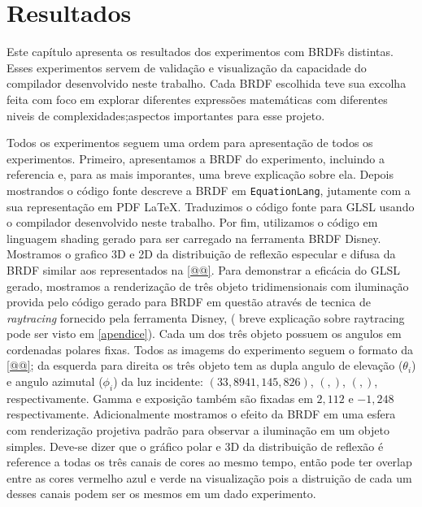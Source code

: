 \chapter{Resultados}
\label{chapter.resultados}


Este capítulo apresenta os resultados dos experimentos com BRDFs distintas. Esses experimentos servem de validação e visualização da capacidade do compilador desenvolvido neste trabalho. Cada BRDF escolhida teve sua excolha feita com foco em explorar diferentes expressões matemáticas com diferentes niveis de complexidades;aspectos importantes para esse projeto.

Todos os experimentos seguem uma ordem para apresentação de todos os experimentos. Primeiro, apresentamos a BRDF do experimento, incluindo a referencia e, para as mais imporantes, uma breve explicação sobre ela. Depois mostrandos o código fonte descreve a BRDF em \texttt{EquationLang}, jutamente com a sua representação em PDF \LaTeX. Traduzimos o código fonte para GLSL usando o compilador desenvolvido neste trabalho. Por fim, utilizamos o código em linguagem shading gerado para ser carregado na ferramenta BRDF Disney. Mostramos o grafico 3D e 2D da distribuição de reflexão especular e difusa da BRDF similar aos representados na \autoref{@@}. Para demonstrar a eficácia do GLSL gerado, mostramos a renderização de três objeto tridimensionais com iluminação provida pelo código gerado para BRDF em questão através de tecnica de \textit{raytracing} fornecido pela ferramenta Disney, ( breve explicação sobre raytracing pode ser visto em \autoref{apendice}). Cada um dos três objeto possuem os angulos em cordenadas polares fixas. Todos as imagems do experimento seguem o formato da \autoref{@@}; da esquerda para direita os três objeto tem as dupla angulo de elevação ($\theta_i$)  e angulo azimutal ($\phi_i$) da luz incidente: $\left(33,8941, 145,826\right)$, $\left( ,\right)$, $\left( ,\right)$, respectivamente. Gamma e exposição também são fixadas em $2,112$ e $-1,248$ respectivamente. Adicionalmente mostramos o efeito da BRDF em uma esfera com renderização projetiva padrão para observar a iluminação em um objeto simples.
Deve-se dizer que o gráfico polar e 3D da distribuição de reflexão é reference a todas os três canais de cores ao mesmo tempo, então pode ter overlap entre as cores vermelho azul e verde na visualização pois a distruição de cada um desses canais podem ser os mesmos em um dado experimento.

